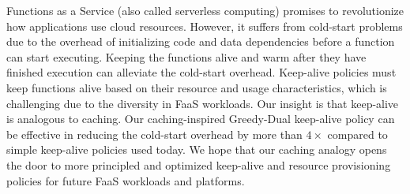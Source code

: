 
Functions as a Service (also called serverless computing) promises to revolutionize how applications use cloud resources. 
%
However, it suffers from cold-start problems due to the overhead of initializing code and data dependencies before a function can start executing. 
%
Keeping the functions alive and warm after they have finished execution can alleviate the cold-start overhead. 
%
Keep-alive policies must keep functions alive based on their resource and usage characteristics, which is challenging due to the diversity in FaaS workloads. 
%
Our insight is that keep-alive is analogous to caching.
%
Our caching-inspired Greedy-Dual keep-alive policy can be effective in reducing the cold-start overhead by more than $4\times$ compared to simple keep-alive policies used today. 
%
We hope that our caching analogy opens the door to more principled and optimized keep-alive and resource provisioning policies for future FaaS workloads and platforms. 



